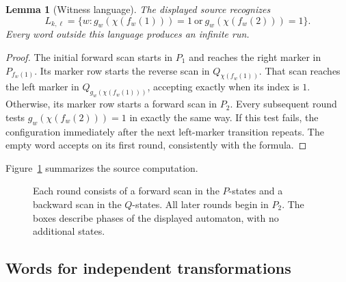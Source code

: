 \documentclass[11pt,a4paper]{article}
\newtheorem{lemma}[theorem]{Lemma}
\theoremstyle{definition}
\theoremstyle{remark}
\newcommand{\LL}{\mathsf L}
\begin{document}
\begin{lemma}[Witness language]\label{lem:witness-language}
The displayed source recognizes
\begin{equation}\label{eq:witness-language}
L_{k,\ell}=\bigl\{w:
 g_w(\chi(f_w(1)))=1\ \text{or}\ g_w(\chi(f_w(2)))=1\bigr\}.
\end{equation}
Every word outside this language produces an infinite run.
\end{lemma}
\begin{proof}
The initial forward scan starts in $P_1$ and reaches the right marker in
$P_{f_w(1)}$. Its marker row starts the reverse scan in $Q_{\chi(f_w(1))}$.
That scan reaches the left marker in $Q_{g_w(\chi(f_w(1)))}$, accepting exactly
when its index is $1$. Otherwise, its marker row starts a forward scan in
$P_2$. Every subsequent round tests $g_w(\chi(f_w(2)))=1$ in exactly the same
way. If this test fails, the configuration immediately after the next
left-marker transition repeats. The empty word accepts on its first
round, consistently with the formula.
\end{proof}

Figure~\ref{fig:witness} summarizes the source computation.

\begin{figure}[tb]
\centering
{}
\caption{Each round consists of a forward scan in the $P$-states and
a backward scan in the $Q$-states. All later rounds begin in $P_2$.
The boxes describe phases of the displayed automaton, with no
additional states.}
\label{fig:witness}
\end{figure}

\subsection{Words for independent transformations}
\end{document}
